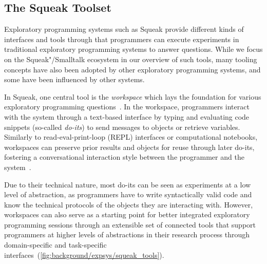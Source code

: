 \subsection[The Squeak Toolset]{%
	The Squeak Toolset
	\hfill
}
\label{sec:background/expsys/tools}

Exploratory programming systems such as Squeak provide different kinds of interfaces and tools through that programmers can execute experiments in traditional exploratory programming systems to answer questions.
While we focus on the Squeak"/Smalltalk ecosystem in our overview of such tools, many tooling concepts have also been adopted by other exploratory programming systems, and some have been influenced by other systems.

In Squeak, one central tool is the \emph{workspace} which lays the foundation for various exploratory programming questions~\cites[chap.~6]{goldberg1984smalltalk}[sec.~1.4]{thiede2023squeak}.
In the workspace, programmers interact with the system through a text-based interface by typing and evaluating code snippets (so-called \emph{do-its}) to send messages to objects or retrieve variables.
Similarly to read-eval-print-loop (REPL) interfaces or computational notebooks, workspaces can preserve prior results and objects for reuse through later do-its, fostering a conversational interaction style between the programmer and the system~\cite{taeumel2022pattern}.

Due to their technical nature, most do-its can be seen as experiments at a low level of abstraction, as programmers have to write syntactically valid code and know the technical protocols of the objects they are interacting with.
However, workspaces can also serve as a starting point for better integrated exploratory programming sessions through an extensible set of connected tools that support programmers at higher levels of abstractions in their research process through domain-specific and task-specific interfaces~(\cref{fig:background/expsys/squeak_tools}).

